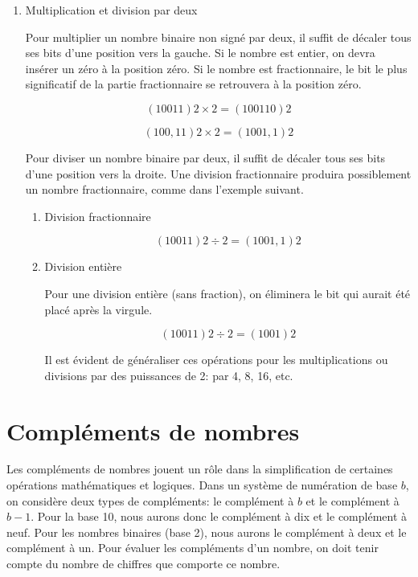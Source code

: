 \documentclass[letter, oneside]{book}
\begin{document}
\begin{enumerate}
\item Multiplication et division par deux
\label{sec:orgbbd1727}

Pour multiplier un nombre binaire non signé par deux, il suffit de
décaler tous ses bits d'une position vers la gauche. Si le nombre est
entier, on devra insérer un zéro à la position zéro. Si le nombre est
fractionnaire, le bit le plus significatif de la partie fractionnaire se
retrouvera à la position zéro.

$$ (10011)2 \times 2 = (100110)2 $$

$$ (100,11)2 \times 2 = (1001,1)2 $$

Pour diviser un nombre binaire par deux, il suffit de décaler tous ses
bits d'une position vers la droite. Une division fractionnaire
produira possiblement un nombre fractionnaire, comme dans l'exemple
suivant.

\begin{enumerate}
\item Division fractionnaire
\label{sec:org8d92172}

$$ (10011)2 \div 2 = (1001,1)2 $$

\item Division entière
\label{sec:orgbb584ae}

Pour une division entière (sans fraction), on éliminera le bit qui
aurait été placé après la virgule.

$$ (10011)2 \div 2 = (1001)2 $$

Il est évident de généraliser ces opérations pour les multiplications
ou divisions par des puissances de 2: par 4, 8, 16, etc.
\end{enumerate}
\end{enumerate}

\section{Compléments de nombres}
\label{sec:org99aad12}

Les compléments de nombres jouent un rôle dans la simplification de
certaines opérations mathématiques et logiques. Dans un système de
numération de base \(b\), on considère deux types de compléments: le
complément à \(b\) et le complément à \(b-1\). Pour la base 10, nous
aurons donc le complément à dix et le complément à neuf. Pour les
nombres binaires (base 2), nous aurons le complément à deux et le
complément à un.  Pour évaluer les compléments d'un nombre, on doit
tenir compte du nombre de chiffres que comporte ce nombre.
\end{document}
